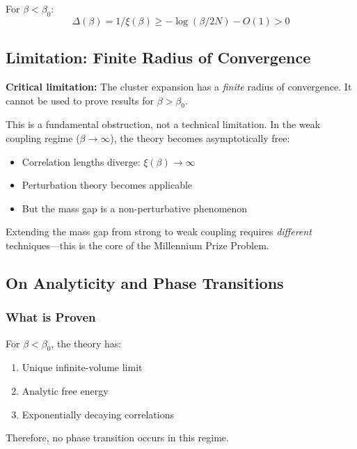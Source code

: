 \begin{corollary}
\label{cor:mass-gap-strong}
For $\beta < \beta_0$:
\[
\Delta(\beta) = 1/\xi(\beta) \geq -\log(\beta/2N) - O(1) > 0
\]
\end{corollary}

\subsection{Limitation: Finite Radius of Convergence}

\begin{remark}
\label{rem:cluster-breakdown}
\textbf{Critical limitation:} The cluster expansion has a \emph{finite} radius 
of convergence. It cannot be used to prove results for $\beta > \beta_0$.

This is a fundamental obstruction, not a technical limitation. In the weak 
coupling regime ($\beta \to \infty$), the theory becomes asymptotically free:
\begin{itemize}
    \item Correlation lengths diverge: $\xi(\beta) \to \infty$
    \item Perturbation theory becomes applicable
    \item But the mass gap is a non-perturbative phenomenon
\end{itemize}

Extending the mass gap from strong to weak coupling requires \emph{different} 
techniques---this is the core of the Millennium Prize Problem.
\end{remark}

\subsection{On Analyticity and Phase Transitions}

\subsubsection{What is Proven}

\begin{theorem}
For $\beta < \beta_0$, the theory has:
\begin{enumerate}[label=(\roman*)]
    \item Unique infinite-volume limit
    \item Analytic free energy
    \item Exponentially decaying correlations
\end{enumerate}
Therefore, no phase transition occurs in this regime.
\end{theorem}

